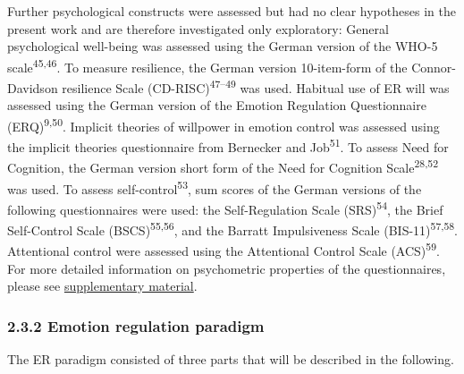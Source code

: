\documentclass[
  man,floatsintext]{apa6}
\begin{document}
Further psychological constructs were assessed but had no clear hypotheses in the present work and are therefore investigated only exploratory:
General psychological well-being was assessed using the German version of the WHO-5 scale\textsuperscript{45,46}.
To measure resilience, the German version 10-item-form of the Connor-Davidson resilience Scale (CD-RISC)\textsuperscript{47--49} was used.
Habitual use of ER will was assessed using the German version of the Emotion Regulation Questionnaire (ERQ)\textsuperscript{9,50}.
Implicit theories of willpower in emotion control was assessed using the implicit theories questionnaire from Bernecker and Job\textsuperscript{51}.
To assess Need for Cognition, the German version short form of the Need for Cognition Scale\textsuperscript{28,52} was used.
To assess self-control\textsuperscript{53}, sum scores of the German versions of the following questionnaires were used: the Self-Regulation Scale (SRS)\textsuperscript{54}, the Brief Self-Control Scale (BSCS)\textsuperscript{55,56}, and the Barratt Impulsiveness Scale (BIS-11)\textsuperscript{57,58}.
Attentional control were assessed using the Attentional Control Scale (ACS)\textsuperscript{59}.
For more detailed information on psychometric properties of the questionnaires, please see \protect\hyperlink{SupplementQuestionnaires}{supplementary material}.

\hypertarget{emotion-regulation-paradigm}{%
\subsubsection{2.3.2 Emotion regulation paradigm}\label{emotion-regulation-paradigm}}

The ER paradigm consisted of three parts that will be described in the following.
\end{document}
